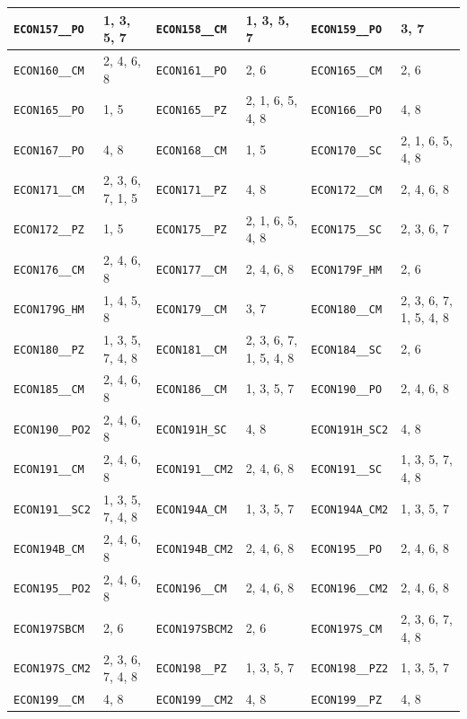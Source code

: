 \begin{longtable}{|l|l||l|l||l|l|}
    \verb|ECON157__PO| & 1, 3, 5, 7 & \verb|ECON158__CM| & 1, 3, 5, 7 & \verb|ECON159__PO| & 3, 7\\\hline
    \verb|ECON160__CM| & 2, 4, 6, 8 & \verb|ECON161__PO| & 2, 6 & \verb|ECON165__CM| & 2, 6\\\hline
    \verb|ECON165__PO| & 1, 5 & \verb|ECON165__PZ| & 2, 1, 6, 5, 4, 8 & \verb|ECON166__PO| & 4, 8\\\hline
    \verb|ECON167__PO| & 4, 8 & \verb|ECON168__CM| & 1, 5 & \verb|ECON170__SC| & 2, 1, 6, 5, 4, 8\\\hline
    \verb|ECON171__CM| & 2, 3, 6, 7, 1, 5 & \verb|ECON171__PZ| & 4, 8 & \verb|ECON172__CM| & 2, 4, 6, 8\\\hline
    \verb|ECON172__PZ| & 1, 5 & \verb|ECON175__PZ| & 2, 1, 6, 5, 4, 8 & \verb|ECON175__SC| & 2, 3, 6, 7\\\hline
    \verb|ECON176__CM| & 2, 4, 6, 8 & \verb|ECON177__CM| & 2, 4, 6, 8 & \verb|ECON179F_HM| & 2, 6\\\hline
    \verb|ECON179G_HM| & 1, 4, 5, 8 & \verb|ECON179__CM| & 3, 7 & \verb|ECON180__CM| & 2, 3, 6, 7, 1, 5, 4, 8\\\hline
    \verb|ECON180__PZ| & 1, 3, 5, 7, 4, 8 & \verb|ECON181__CM| & 2, 3, 6, 7, 1, 5, 4, 8 & \verb|ECON184__SC| & 2, 6\\\hline
    \verb|ECON185__CM| & 2, 4, 6, 8 & \verb|ECON186__CM| & 1, 3, 5, 7 & \verb|ECON190__PO| & 2, 4, 6, 8\\\hline
    \verb|ECON190__PO2| & 2, 4, 6, 8 & \verb|ECON191H_SC| & 4, 8 & \verb|ECON191H_SC2| & 4, 8\\\hline
    \verb|ECON191__CM| & 2, 4, 6, 8 & \verb|ECON191__CM2| & 2, 4, 6, 8 & \verb|ECON191__SC| & 1, 3, 5, 7, 4, 8\\\hline
    \verb|ECON191__SC2| & 1, 3, 5, 7, 4, 8 & \verb|ECON194A_CM| & 1, 3, 5, 7 & \verb|ECON194A_CM2| & 1, 3, 5, 7\\\hline
    \verb|ECON194B_CM| & 2, 4, 6, 8 & \verb|ECON194B_CM2| & 2, 4, 6, 8 & \verb|ECON195__PO| & 2, 4, 6, 8\\\hline
    \verb|ECON195__PO2| & 2, 4, 6, 8 & \verb|ECON196__CM| & 2, 4, 6, 8 & \verb|ECON196__CM2| & 2, 4, 6, 8\\\hline
    \verb|ECON197SBCM| & 2, 6 & \verb|ECON197SBCM2| & 2, 6 & \verb|ECON197S_CM| & 2, 3, 6, 7, 4, 8\\\hline
    \verb|ECON197S_CM2| & 2, 3, 6, 7, 4, 8 & \verb|ECON198__PZ| & 1, 3, 5, 7 & \verb|ECON198__PZ2| & 1, 3, 5, 7\\\hline
    \verb|ECON199__CM| & 4, 8 & \verb|ECON199__CM2| & 4, 8 & \verb|ECON199__PZ| & 4, 8\\\hline

\end{longtable}
